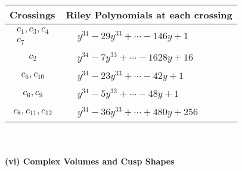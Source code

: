 \documentclass[1p]{elsarticle_modified}
\theoremstyle{definition}
\begin{document}
\begin{tabular}{m{50pt}|m{274pt}}
Crossings & \hspace{64pt}Riley Polynomials at each crossing \\
\hline $$\begin{aligned}c_{1},c_{3},c_{4}\\c_{7}\end{aligned}$$&$\begin{aligned}
&y^{34}-29 y^{33}+\cdots-146 y+1
\end{aligned}$\\
\hline $$\begin{aligned}c_{2}\end{aligned}$$&$\begin{aligned}
&y^{34}-7 y^{33}+\cdots-1628 y+16
\end{aligned}$\\
\hline $$\begin{aligned}c_{5},c_{10}\end{aligned}$$&$\begin{aligned}
&y^{34}-23 y^{33}+\cdots-42 y+1
\end{aligned}$\\
\hline $$\begin{aligned}c_{6},c_{9}\end{aligned}$$&$\begin{aligned}
&y^{34}-5 y^{33}+\cdots-48 y+1
\end{aligned}$\\
\hline $$\begin{aligned}c_{8},c_{11},c_{12}\end{aligned}$$&$\begin{aligned}
&y^{34}-36 y^{33}+\cdots+480 y+256
\end{aligned}$\\
\hline
\end{tabular}\\~\\
\newpage\flushleft \textbf{(vi) Complex Volumes and Cusp Shapes}
\end{document}
